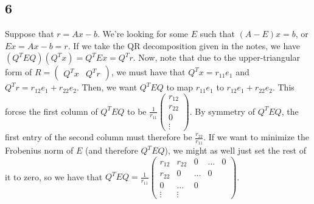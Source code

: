 \documentclass{article}
\newcommand{\openm}{\begin{pmatrix}}
\newcommand{\closem}{\end{pmatrix}}
\begin{document}
\subsection*{6}
Suppose that $r=Ax-b$. We're looking for some $E$ such that $(A-E)x=b$, or $Ex=Ax-b=r$. If we take the QR decomposition given in the notes, we have $(Q^TEQ)(Q^Tx)=Q^TEx=Q^Tr$. Now, note that due to the upper-triangular form of $R=\openm Q^Tx&Q^Tr\closem$, we must have that $Q^Tx=r_{11}e_1$ and $Q^Tr=r_{12}e_1+r_{22}e_2$. Then, we want $Q^TEQ$ to map $r_{11}e_1$ to $r_{12}e_1+r_{22}e_2$. This forcse the first column of $Q^TEQ$ to be $\frac{1}{r_{11}}\openm r_{12}\\r_{22}\\0\\\vdots\closem$. By symmetry of $Q^TEQ$, the first entry of the second column must therefore be $\frac{r_{22}}{r_{11}}$. If we want to minimize the Frobenius norm of $E$ (and therefore $Q^TEQ$), we might as well just set the rest of it to zero, so we have that $Q^TEQ=\frac{1}{r_{11}}\openm r_{12}&r_{22}&0&\hdots&0\\r_{22}&0&\hdots&0\\0&\hdots&0\\\vdots&\vdots\closem$.
\end{document}
